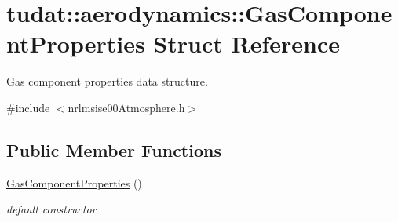 \hypertarget{structtudat_1_1aerodynamics_1_1GasComponentProperties}{}\section{tudat\+:\+:aerodynamics\+:\+:Gas\+Component\+Properties Struct Reference}
\label{structtudat_1_1aerodynamics_1_1GasComponentProperties}


Gas component properties data structure.  




{\ttfamily \#include $<$nrlmsise00\+Atmosphere.\+h$>$}

\subsection*{Public Member Functions}
\begin{DoxyCompactItemize}
\item 
\hyperlink{structtudat_1_1aerodynamics_1_1GasComponentProperties_aff9b2511fcc561249671fb09a33556a0}{Gas\+Component\+Properties} ()
\begin{DoxyCompactList}\small\item\em default constructor \end{DoxyCompactList}\end{DoxyCompactItemize}
